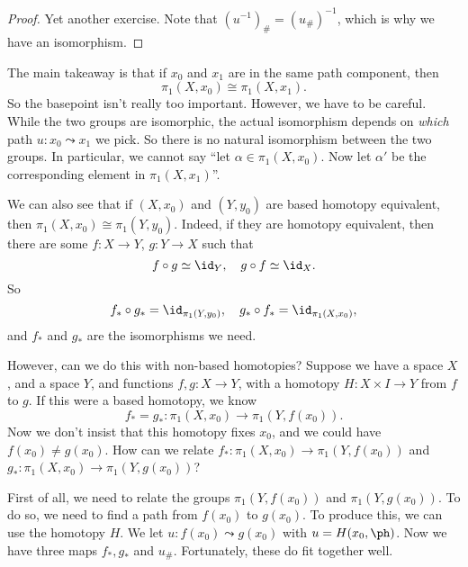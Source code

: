 \documentclass[a4paper]{article}
\begin{document}
\begin{proof}
  Yet another exercise. Note that $(u^{-1})_\# = (u_\#)^{-1}$, which is why we have an isomorphism. %
\end{proof}
The main takeaway is that if $x_0$ and $x_1$ are in the same path component, then
\[
  \pi_1(X, x_0) \cong \pi_1(X, x_1).
\]
So the basepoint isn't really too important. However, we have to be careful. While the two groups are isomorphic, the actual isomorphism depends on \emph{which} path $u: x_0 \leadsto x_1$ we pick. So there is no natural isomorphism between the two groups. In particular, we cannot say ``let $\alpha \in \pi_1(X, x_0)$. Now let $\alpha'$ be the corresponding element in $\pi_1(X, x_1)$''.

We can also see that if $(X, x_0)$ and $(Y, y_0)$ are based homotopy equivalent, then $\pi_1(X, x_0)\cong \pi_1(Y, y_0)$. Indeed, if they are homotopy equivalent, then there are some $f: X \to Y$, $g: Y \to X$ such that
\[
  f\circ g \simeq \id_Y,\quad g\circ f \simeq \id_X.
\]
So
\[
  f_*\circ g_* = \id_{\pi_1(Y, y_0)},\quad g_*\circ f_* = \id_{\pi_1(X, x_0)},
\]
and $f_*$ and $g_*$ are the isomorphisms we need.

However, can we do this with non-based homotopies? Suppose we have a space $X$, and a space $Y$, and functions $f, g: X \to Y$, with a homotopy $H: X\times I \to Y$ from $f$ to $g$. If this were a based homotopy, we know
\[
  f_* = g_*: \pi_1(X, x_0) \to \pi_1(Y, f(x_0)).
\]
Now we don't insist that this homotopy fixes $x_0$, and we could have $f(x_0) \not= g(x_0)$. How can we relate $f_*: \pi_1(X, x_0) \to \pi_1(Y, f(x_0))$ and $g_*: \pi_1(X, x_0) \to \pi_1(Y, g(x_0))$?

First of all, we need to relate the groups $\pi_1(Y, f(x_0))$ and $\pi_1(Y, g(x_0))$. To do so, we need to find a path from $f(x_0)$ to $g(x_0)$. To produce this, we can use the homotopy $H$. We let $u: f(x_0) \leadsto g(x_0)$ with $u = H(x_0, \ph)$. Now we have three maps $f_*, g_*$ and $u_\#$. Fortunately, these do fit together well.
\begin{center}
\end{center}
\end{document}
